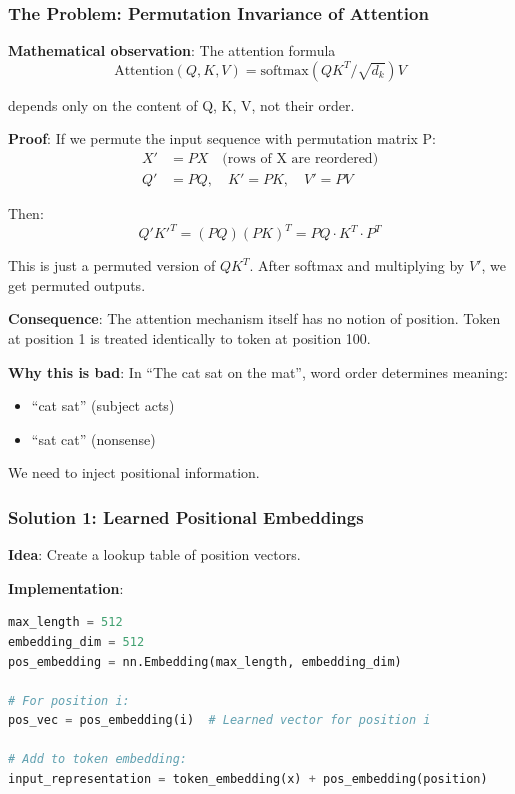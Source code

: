 \documentclass[11pt,oneside]{book}
\begin{document}
\subsubsection{The Problem: Permutation Invariance of Attention}

\textbf{Mathematical observation}: The attention formula
\[
\text{Attention}(Q, K, V) = \text{softmax}(QK^T/\sqrt{d_k}) V
\]

depends only on the content of Q, K, V, not their order.

\textbf{Proof}: If we permute the input sequence with permutation matrix P:
\begin{align*}
X' &= PX  \quad \text{(rows of X are reordered)} \\
Q' &= PQ, \quad K' = PK, \quad V' = PV
\end{align*}

Then:
\[
Q'K'^T = (PQ)(PK)^T = PQ \cdot K^T \cdot P^T
\]

This is just a permuted version of $QK^T$. After softmax and multiplying by $V'$, we get permuted outputs.

\textbf{Consequence}: The attention mechanism itself has no notion of position. Token at position 1 is treated identically to token at position 100.

\textbf{Why this is bad}: In ``The cat sat on the mat'', word order determines meaning:
\begin{itemize}
\item ``cat sat'' (subject acts)
\item ``sat cat'' (nonsense)
\end{itemize}

We need to inject positional information.

\subsubsection{Solution 1: Learned Positional Embeddings}

\textbf{Idea}: Create a lookup table of position vectors.

\textbf{Implementation}:
\begin{lstlisting}[language=Python]
max_length = 512
embedding_dim = 512
pos_embedding = nn.Embedding(max_length, embedding_dim)

# For position i:
pos_vec = pos_embedding(i)  # Learned vector for position i

# Add to token embedding:
input_representation = token_embedding(x) + pos_embedding(position)
\end{lstlisting}
\end{document}
